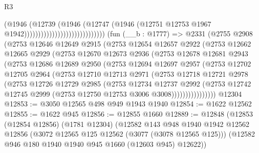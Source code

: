 \begin{lexlean}{R3}
\begin{coremodule}
                                                  (@1946
                                                    (@12739
                                                      (@1946
                                                        (@12747
                                                          (@1946
                                                            (@12751
                                                              @12753
                                                              @1967
                                                              @1942)))))))))))))))))))))))))))))
    (fun (__b : @1777) =>
    @2331
      (@2755
        @2908
        (@2753
          @12646
          @12649
          @2915
          (@2753
            @12654
            @12657
            @2922
            (@2753
              @12662
              @12665
              @2929
              (@2753
                @12670
                @12673
                @2936
                (@2753
                  @12678
                  @12681
                  @2943
                  (@2753
                    @12686
                    @12689
                    @2950
                    (@2753
                      @12694
                      @12697
                      @2957
                      (@2753
                        @12702
                        @12705
                        @2964
                        (@2753
                          @12710
                          @12713
                          @2971
                          (@2753
                            @12718
                            @12721
                            @2978
                            (@2753
                              @12726
                              @12729
                              @2985
                              (@2753
                                @12734
                                @12737
                                @2992
                                (@2753
                                  @12742
                                  @12745
                                  @2999
                                  (@2753 @12750 @12753 @3006 @3008))))))))))))))))
    @12304
@12853 := @3050 @12565 @498 @949 @1943 @1940
@12854 := @1622 @12562
@12855 := @1622 @945
@12856 := @12855 @1660
@12889 := @12848
    (@12853
      (@12854 @12856)
      (@1781 @12304)
      (@12582
        @143
        @948
        @1940
        @1942
        @12562
        @12856
        (@3072 @12565 @125 @12562 (@3077 (@3078 @12565 @125)))
        (@12582 @946 @180 @1940 @1940 @945 @1660 (@12603 @945) @12622))

\end{coremodule}
\end{lexlean}
